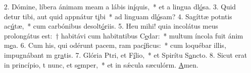 2. Dómine, líbera ánimam meam a lábis in\uline{í}quis,~* et a lingua dl\uline{ó}sa.
3. Quid detur tibi, aut quid appnátur t\uline{i}bi~* ad linguam dl\uline{ó}sam?
4. Sagíttæ potntis ac\uline{ú}tæ,~* cum carbónibus desolt\uline{ó}riis.
5. Heu mihi! quia incolátus meus prolongátus est:~† habitávi cum habitntibus C\uline{e}dar:~* multum íncola fuit ánim m\uline{e}a.
6. Cum his, qui odérunt pacem, ram pac\uline{í}ficus:~* cum loquébar illis, impugnábant m gr\uline{a}tis.
7. Glória Ptri, et F\uline{í}lio,~* et Spirítu S\uline{a}ncto.
8. Sicut erat in princípio, t nunc, et s\uline{e}mper,~* et in sǽcula sæculórm. \uline{A}men.
